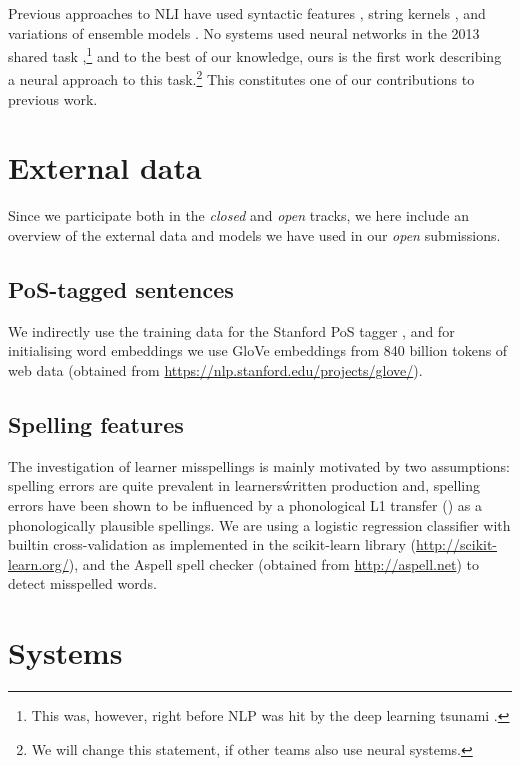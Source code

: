 \documentclass[11pt,letterpaper]{article}
\begin{document}
Previous approaches to NLI have used syntactic features \citep{bykh:2014}, string kernels \citep{ionescu:2014}, and variations of ensemble models \citep{malmasi:2017:nlisg,nli2013}.
No systems used neural networks in the 2013 shared task \citep{nli2013},\footnote{This was, however, right before NLP was hit by the deep learning tsunami \citep{manning:2016}.} and to the best of our knowledge, ours is the first work describing a neural approach to this task.\footnote{We will change this statement, if other teams also use neural systems.}
This constitutes one of our contributions to previous work.

\section{External data}

Since we participate both in the \textit{closed} and \textit{open} tracks, we here include an overview of the external data and models we have used in our \textit{open} submissions.

\subsection{PoS-tagged sentences}
We indirectly use the training data for the Stanford PoS tagger
\citep{Manning2014corenlp}, and for initialising word embeddings we use
GloVe embeddings from 840 billion tokens of web data (obtained from
\url{https://nlp.stanford.edu/projects/glove/}).

\subsection{Spelling features}
The investigation of learner misspellings is mainly motivated by two assumptions: spelling errors are quite prevalent in learners\' written production and, spelling errors have been shown  to be influenced by a phonological L1 transfer (\citep{grigonyte2014pronunciation}) as a phonologically plausible spellings. 
We are using a logistic regression classifier with builtin cross-validation as implemented in the scikit-learn library (\url{http://scikit-learn.org/}), and the Aspell spell checker (obtained from \url{http://aspell.net}) to detect misspelled words. 

\section{Systems}
\end{document}
